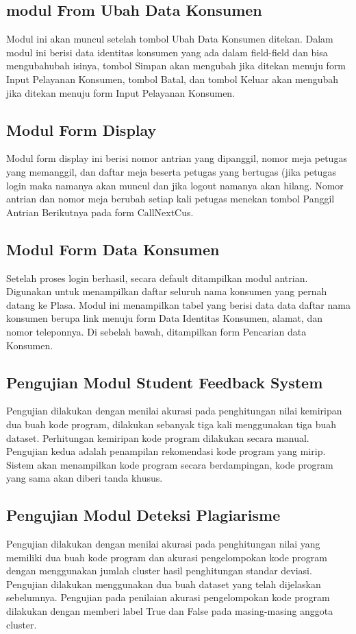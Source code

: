\subsection{modul From Ubah Data Konsumen}
Modul ini akan muncul setelah tombol Ubah Data Konsumen ditekan. Dalam modul ini berisi data identitas konsumen yang ada dalam field-field dan bisa mengubahubah isinya, tombol Simpan akan mengubah jika ditekan menuju form Input Pelayanan Konsumen, tombol Batal, dan tombol Keluar akan mengubah jika ditekan menuju form Input Pelayanan Konsumen.
\subsection{Modul Form Display}
Modul form display ini berisi nomor antrian yang dipanggil, nomor meja petugas yang memanggil, dan daftar meja beserta petugas yang bertugas (jika petugas login maka namanya akan muncul dan jika logout namanya akan hilang. Nomor antrian dan nomor meja berubah setiap kali petugas menekan tombol Panggil Antrian Berikutnya pada form CallNextCus.
\subsection{Modul Form Data Konsumen}
Setelah proses login berhasil, secara default ditampilkan modul antrian. Digunakan untuk menampilkan daftar seluruh nama konsumen yang pernah datang ke Plasa. Modul ini menampilkan tabel yang berisi data data daftar nama konsumen berupa link menuju form Data Identitas Konsumen, alamat, dan nomor teleponnya. Di sebelah bawah, ditampilkan form  Pencarian data Konsumen.
\subsection{Pengujian Modul Student Feedback System}
Pengujian dilakukan dengan menilai akurasi pada penghitungan nilai kemiripan dua buah kode program, dilakukan sebanyak tiga kali menggunakan tiga buah dataset. Perhitungan kemiripan kode program dilakukan secara manual.
Pengujian kedua adalah penampilan rekomendasi kode program yang mirip. Sistem akan menampilkan kode program secara berdampingan, kode program yang sama akan diberi tanda khusus.
\subsection{Pengujian Modul Deteksi Plagiarisme}
Pengujian dilakukan dengan menilai akurasi pada penghitungan nilai yang memiliki dua buah kode program dan akurasi pengelompokan kode program dengan menggunakan jumlah cluster hasil penghitungan standar deviasi. Pengujian dilakukan menggunakan dua buah dataset yang telah dijelaskan sebelumnya. Pengujian pada penilaian akurasi pengelompokan kode program dilakukan dengan memberi label True dan False pada masing-masing anggota cluster. 

